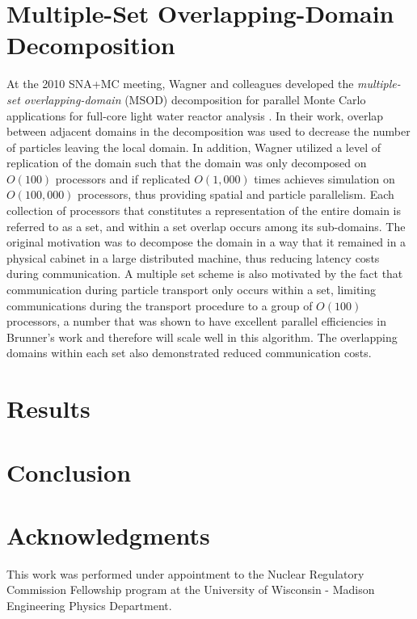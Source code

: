 \documentclass[letterpaper,10pt]{article}
\begin{document}
\section{Multiple-Set Overlapping-Domain Decomposition}

At the 2010 SNA+MC meeting, Wagner and colleagues developed the
\textit{multiple-set overlapping-domain} (MSOD) decomposition for
parallel Monte Carlo applications for full-core light water reactor
analysis \cite{wagner_hybrid_2010}. In their work, overlap between
adjacent domains in the decomposition was used to decrease the number
of particles leaving the local domain. In addition, Wagner utilized a
level of replication of the domain such that the domain was only
decomposed on $O(100)$ processors and if replicated $O(1,000)$ times
achieves simulation on $O(100,000)$ processors, thus providing spatial
and particle parallelism. Each collection of processors that
constitutes a representation of the entire domain is referred to as a
set, and within a set overlap occurs among its sub-domains. The
original motivation was to decompose the domain in a way that it
remained in a physical cabinet in a large distributed machine, thus
reducing latency costs during communication. A multiple set scheme is
also motivated by the fact that communication during particle
transport only occurs within a set, limiting communications during the
transport procedure to a group of $O(100)$ processors, a number that
was shown to have excellent parallel efficiencies in Brunner's work
and therefore will scale well in this algorithm. The overlapping
domains within each set also demonstrated reduced communication costs.

\section{Results}

\section{Conclusion}

\section*{Acknowledgments}

This work was performed under appointment to the Nuclear Regulatory
Commission Fellowship program at the University of Wisconsin - Madison
Engineering Physics Department.

\pagebreak


\end{document}
